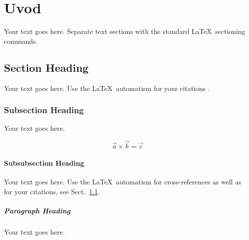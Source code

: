 %
\chapter{Uvod}
\label{intro} %

Your text goes here. Separate text sections with the standard \LaTeX\
sectioning commands.

\section{Section Heading}
\label{sec:1}
Your text goes here. Use the \LaTeX\ automatism for your citations
\cite{monograph}.

\subsection{Subsection Heading}
\label{sec:2}
Your text goes here.

\begin{equation}
\vec{a}\times\vec{b}=\vec{c}
\end{equation}

\subsubsection{Subsubsection Heading}
Your text goes here. Use the \LaTeX\ automatism for cross-references as
well as for your citations, see Sect.~\ref{sec:1}.

\paragraph{Paragraph Heading} %
Your text goes here.


